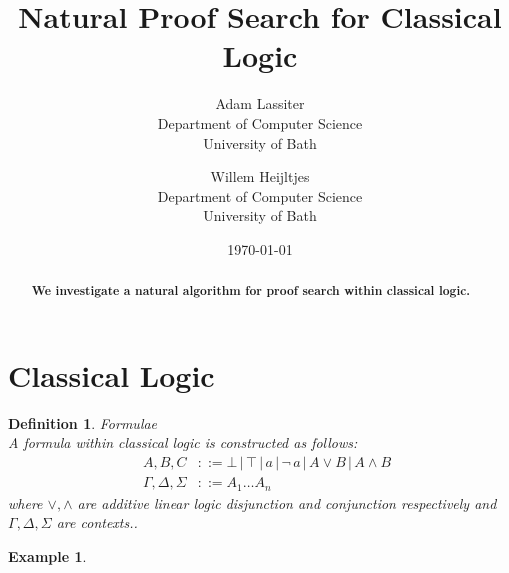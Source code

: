 \documentclass{article}
\title{Natural Proof Search for Classical Logic}
\author{Adam Lassiter\\Department of Computer Science\\University of Bath \and Willem Heijltjes\\Department of Computer Science\\University of Bath}
\date{\today}
\def\defeq{::=}
\theoremstyle{indented}
\newtheorem{definition}[sec-ctr]{Definition}
\newtheorem*{example*}{Example}
\begin{document}
    \maketitle
    \begin{abstract}
        \textbf{We investigate a natural algorithm for proof search within classical logic.}
    \end{abstract}

    \section{Classical Logic}

        \begin{definition}{Formulae\\}
            A \textit{formula} within classical logic is constructed as follows:
            \begin{align*}
                \quad A, B, C                &\defeq \bot \,|\, \top \,|\, a \,|\, \neg\, a \,|\, A \vee B \,|\, A \wedge B \\
                \quad \Gamma, \Delta, \Sigma &\defeq A_1 \ldots A_n
            \end{align*}
            where $\vee, \wedge$ are additive linear logic disjunction and conjunction respectively and $\Gamma, \Delta, \Sigma$ are contexts..
        \end{definition}

        \begin{example*}
        \end{example*}
\end{document}

